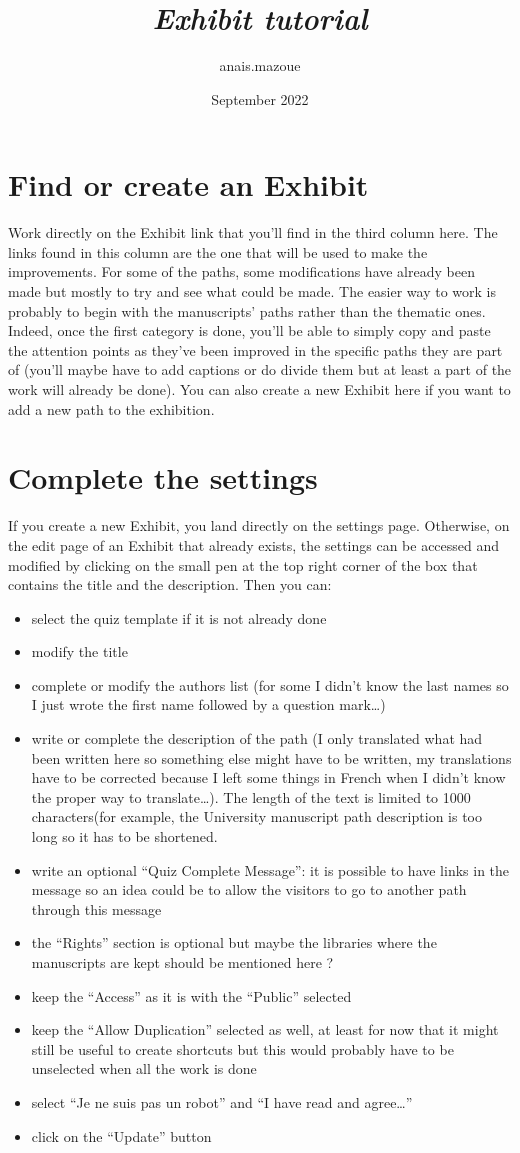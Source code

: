 \documentclass{article}
\title{\textit{Exhibit tutorial}}
\author{anais.mazoue }
\date{September 2022}
\begin{document}
	\section{Find or create an Exhibit}
    Work directly on the Exhibit link that you’ll find in the third column here. The links found in this column are the one that will be used to make the improvements. For some of the paths, some modifications have already been made but mostly to try and see what could be made. The easier way to work is probably to begin with the manuscripts' paths rather than the thematic ones. Indeed, once the first category is done, you’ll be able to simply copy and paste the attention points as they’ve been improved in the specific paths they are part of (you’ll maybe have to add captions or do divide them but at least a part of the work will already be done). 
    You can also create a new Exhibit here if you want to add a new path to the exhibition. 

	\section{Complete the settings}
    If you create a new Exhibit, you land directly on the settings page. Otherwise, on the edit page of an Exhibit that already exists, the settings can be accessed and modified by clicking on the small pen at the top right corner of the box that contains the title and the description. 
    Then you can:
    \begin{itemize}
    \item select the quiz template if it is not already done
    \item modify the title
    \item complete or modify the authors list (for some I didn’t know the last names so I just wrote the first name followed by a question mark…)
    \item write or complete the description of the path (I only translated what had been written here so something else might have to be written, my translations have to be corrected because I left some things in French when I didn't know the proper way to translate…). The length of the text is limited to 1000 characters(for example, the University manuscript path description is too long so it has to be shortened.
    \item write an optional “Quiz Complete Message”: it is possible to have links in the message so an idea could be to allow the visitors to go to another path through this message 
    \item the “Rights” section is optional but maybe the libraries where the manuscripts are kept should be mentioned here ? 
    \item keep the “Access” as it is with the “Public” selected 
    \item keep the “Allow Duplication” selected as well, at least for now that it might still be useful to create shortcuts but this would probably have to be unselected when all the work is done 
    \item select “Je ne suis pas un robot” and “I have read and agree…”
    \item click on the “Update” button
    \end{itemize}
\end{document}
